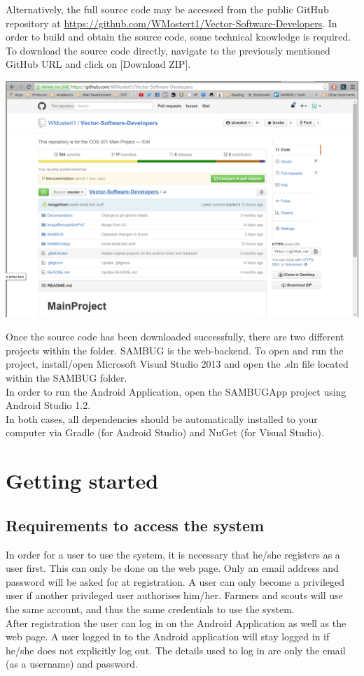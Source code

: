 \documentclass[11pt,a4paper,titlepage]{article}
\begin{document}
Alternatively, the full source code may be accessed from the public GitHub repository at \url{https://github.com/WMostert1/Vector-Software-Developers}. In order to build and obtain the source code, some technical knowledge is required. To download the source code directly, navigate to the previously mentioned GitHub URL and click on [Download ZIP].

	\begin{center}
		\includegraphics[width=\linewidth]{git.png}
	\end{center}

Once the source code has been downloaded successfully, there are two different projects within the folder. SAMBUG is the web-backend. To open and run the project, install/open Microsoft Visual Studio 2013 and open the .sln file located within the SAMBUG folder.\\
In order to run the Android Application, open the SAMBUGApp project using Android Studio 1.2.\\
In both cases, all dependencies should be automatically installed to your computer via Gradle (for Android Studio) and NuGet (for Visual Studio). 
		
\section{Getting started}
\subsection{Requirements to access the system}
In order for a user to use the system, it is necessary that he/she registers as a user first. This can only be done on the web page. Only an email address and password will be asked for at registration. A user can only become a privileged user if another privileged user authorises him/her. Farmers and scouts will use the same account, and thus the same credentials to use the system.\\
After registration the user can log in on the Android Application as well as the web page. A user logged in to the Android application will stay logged in if he/she does not explicitly log out. The details used to log in are only the email (as a username) and password.
\end{document}
